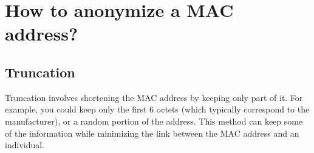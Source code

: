 \documentclass{article}
\begin{document}
\section{\label{sec:Methods}How to anonymize a MAC address?}
  \subsection{\label{subsec:Truncation}Truncation}



  Truncation involves shortening the MAC address by keeping only part of it.
  For example, you could keep only the first 6 octets (which typically correspond to the manufacturer),
  or a random portion of the address. This method can keep some of the information while minimizing 
  the link between the MAC address and an individual.
\end{document}
